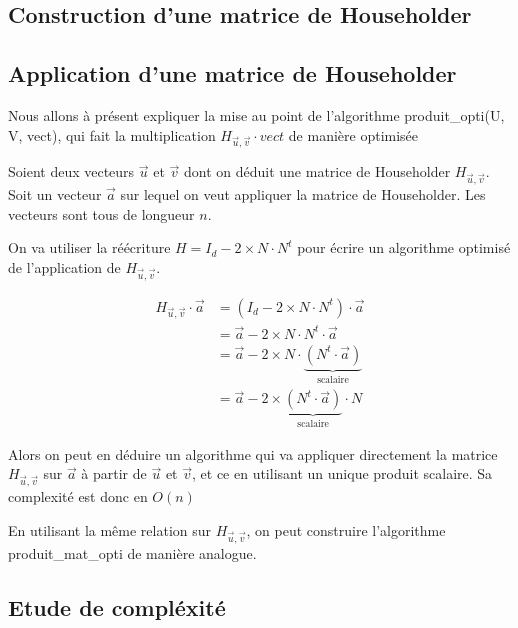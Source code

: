 \documentclass{article}
\begin{document}
\subsection{Construction d'une matrice de Householder}
\label{ssec:construc_householder}

\subsection{Application d'une matrice de Householder}
\label{ssec:appli_householder}

Nous allons à présent expliquer la mise au point de l'algorithme produit\_opti(U, V, vect), qui fait la multiplication
$H_{\vec{u},\vec{v}} \cdot vect$ de manière optimisée

Soient deux vecteurs $\vec{u}$ et $\vec{v}$ dont on déduit une matrice de Householder $H_{\vec{u},\vec{v}}$.
Soit un vecteur $\vec{a}$ sur lequel on veut appliquer la matrice de Householder. Les vecteurs sont tous de longueur $n$.

On va utiliser la réécriture $H = I_d - 2 \times N \cdot N^t$ pour écrire un algorithme optimisé de l'application
de $H_{\vec{u},\vec{v}}$.

\begin{align}
  \label{eq:opti_app_hh}
  H_{\vec{u},\vec{v}} \cdot \vec{a} &= (I_d - 2 \times N \cdot N^t) \cdot \vec{a} \\
                                    &= \vec{a} - 2 \times N \cdot N^t \cdot \vec{a} \\
                                    &= \vec{a} - 2 \times N \cdot \underbrace{(N^t \cdot \vec{a})}_{\text{scalaire}} \\
                                    &= \vec{a} - 2 \times \underbrace{(N^t \cdot \vec{a})}_{\text{scalaire}} \cdot N
\end{align}

Alors on peut en déduire un algorithme qui va appliquer directement la matrice $H_{\vec{u},\vec{v}}$ sur $\vec{a}$ à
partir de $\vec{u}$ et $\vec{v}$, et ce en utilisant un unique produit scalaire. Sa complexité est donc en $O(n)$

En utilisant la même relation sur $H_{\vec{u},\vec{v}}$, on peut construire l'algorithme produit\_mat\_opti de manière analogue.

\subsection{Etude de compléxité}
\label{ssec:complex_householder}
\end{document}
